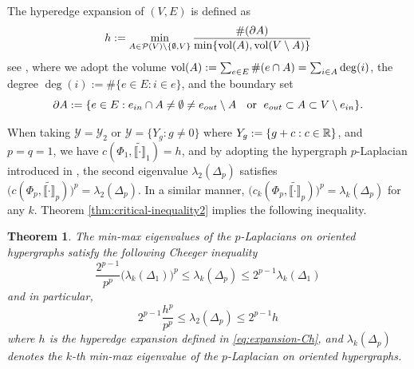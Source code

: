 \documentclass[12pt,a4paper]{article}
\newtheorem{theorem}{Theorem}[section]
\begin{document}
The hyperedge expansion of $(V,E)$ is defined as %
\begin{equation}\label{eq:expansion-Ch}
h:=\min\limits_{A\in\mathcal{P}(V)\setminus\{\emptyset,V\}}\frac{\#(\partial A)}{\min\{\text{\rm vol}(A),\text{\rm vol}(V\setminus A)\}}\end{equation}
see \cite[Chapter 6]{Jost/Mulas/Zhang26}, where we adopt  the volume  $\text{\rm vol}(A):=\sum_{e\in E}\#(e\cap A)=\sum_{i\in A}\deg(i)$, the degree $\deg(i):=\# \{e\in E: i\in e\}$, and the boundary set \begin{equation*}\partial A:=\{e\in E: e_{in}\cap A\ne\emptyset\ne e_{out}\setminus A\text{ \; or\; }e_{out}\subset  A\subset V\setminus e_{in}\}.\end{equation*}



When taking $\mathcal{Y}=\mathcal{Y}_2$ or $\mathcal{Y}=\{Y_g:g\ne0\}$ where $Y_g:=\{g+c:c\in\mathbb{R}\}$, and $p=q=1$, we have  $c(\Phi_1,\widetilde{\llbracket \cdot\rrbracket}_1)=h$, and by adopting the hypergraph $p$-Laplacian introduced in \cite[Chapter 6]{Jost/Mulas/Zhang26}, 
the second eigenvalue $\lambda_2(\Delta_p)$ satisfies   $\big(c(\Phi_p,\widetilde{\llbracket \cdot\rrbracket}_p)\big)^p=\lambda_2(\Delta_p)$. 
In a similar manner, $\big(c_k(\Phi_p,\widetilde{\llbracket \cdot\rrbracket}_p)\big)^p=\lambda_k(\Delta_p)$ for any $k$. 
Theorem \ref{thm:critical-inequality2} implies the following inequality. 
\begin{theorem}
\label{thm:p-Lap-Cheeger}
The min-max eigenvalues of the $p$-Laplacians on oriented hypergraphs satisfy the following Cheeger inequality
$$ \frac{2^{p-1}}{p^p} \big(\lambda_k(\Delta_1)\big)^p\le \lambda_k(\Delta_p)\le2^{p-1}\lambda_k(\Delta_1) $$
and in particular,
\begin{equation}\label{eq:Cheeger-chemical-hyper-p}
2^{p-1}\frac{h^p}{p^p}\le \lambda_2(\Delta_p)\le 2^{p-1}h
\end{equation}
where $h$ is the hyperedge expansion defined in \eqref{eq:expansion-Ch}, and $\lambda_k(\Delta_p)$ denotes the $k$-th min-max eigenvalue of the $p$-Laplacian on oriented hypergraphs.
\end{theorem}
\end{document}

